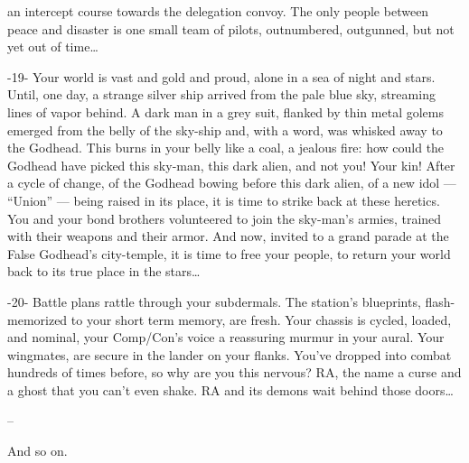 an intercept course towards the delegation convoy. The only people between peace and disaster
is one small team of pilots, outnumbered, outgunned, but not yet out of time…

                                                        -19-
Your world  is vast and gold and proud, alone in a sea of night and stars. Until, one day, a strange
silver ship arrived from the pale blue sky, streaming lines of vapor behind. A dark man in a grey
suit, flanked by thin metal golems emerged from the belly of the sky-ship and, with a word, was
whisked away to the Godhead. This burns in your belly like a coal, a jealous fire: how could the
Godhead have picked this sky-man, this dark alien, and not you! Your kin! After a cycle of change,
of the Godhead bowing before this dark alien, of a new idol — “Union” — being raised in its
place, it is time to strike back at these heretics. You and your bond brothers volunteered to join
the sky-man’s armies, trained with their weapons and their armor. And now, invited to a grand
parade at the False Godhead’s city-temple, it is time to free your people, to return your world
back to its true place in the stars…

                                                        -20-
Battle plans rattle through your subdermals. The station’s blueprints, flash-memorized to your
short term memory, are fresh. Your chassis is cycled, loaded, and nominal, your Comp/Con’s
voice a reassuring murmur in your aural. Your wingmates, are secure in the lander on your flanks.
You’ve dropped into combat hundreds of times before, so why are you this nervous? RA, the
name a curse and a ghost that you can’t even shake. RA and its demons wait behind those
doors…

--

And so on.

